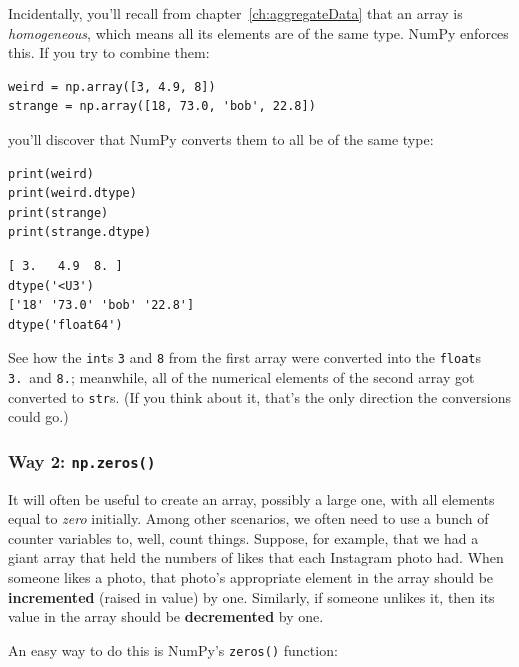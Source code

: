 Incidentally, you'll recall from chapter~\ref{ch:aggregateData} that an array
is \textit{homogeneous}, which means all its elements are of the same type.
NumPy enforces this. If you try to combine them:

\begin{Verbatim}[fontsize=\small,samepage=true,frame=single,framesep=3mm]
weird = np.array([3, 4.9, 8])
strange = np.array([18, 73.0, 'bob', 22.8])
\end{Verbatim}

you'll discover that NumPy converts them to all be of the same type:

\begin{Verbatim}[fontsize=\small,samepage=true,frame=single]
print(weird)
print(weird.dtype)
print(strange)
print(strange.dtype)
\end{Verbatim}

\begin{Verbatim}[fontsize=\small,samepage=true,frame=leftline,framesep=5mm,framerule=1mm]
[ 3.   4.9  8. ]
dtype('<U3')
['18' '73.0' 'bob' '22.8']
dtype('float64')
\end{Verbatim}

See how the \texttt{int}s \texttt{3} and \texttt{8} from the first array were
converted into the \texttt{float}s \texttt{3.}~and \texttt{8.}; meanwhile, all
of the numerical elements of the second array got converted to \texttt{str}s.
(If you think about it, that's the only direction the conversions could go.)

\subsubsection{Way 2: \texttt{np.zeros()}}


It will often be useful to create an array, possibly a large one, with all
elements equal to \textit{zero} initially. Among other scenarios, we often need
to use a bunch of counter variables to, well, count things. Suppose, for
example, that we had a giant array that held the numbers of likes that each
Instagram photo had. When someone likes a photo, that photo's appropriate
element in the array should be \textbf{incremented} (raised in value) by one.
Similarly, if someone unlikes it, then its value in the array should be
\textbf{decremented} by one.

An easy way to do this is NumPy's \texttt{zeros()} function:

